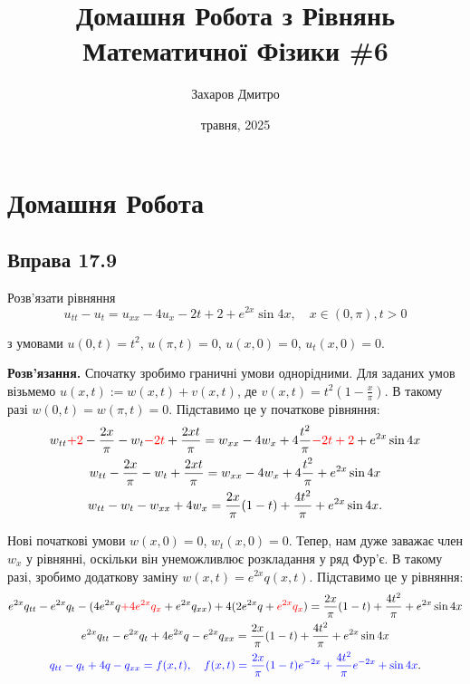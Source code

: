 \documentclass{hw_template}
\title{\huge\sffamily\bfseries Домашня Робота з Рівнянь Математичної Фізики \#6}
\author{\Large\sffamily Захаров Дмитро}
\date{\sffamily 27 травня, 2025}
\begin{document}
\pagestyle{fancy}

\maketitle

\tableofcontents

\pagebreak

\section{Домашня Робота}

\subsection{Вправа 17.9}

\begin{problem}
    Розв'язати рівняння
    \begin{equation*}
        u_{tt} - u_t = u_{xx} - 4u_x - 2t + 2 + e^{2x}\sin 4x, \quad x \in (0,\pi), t > 0
    \end{equation*}

    з умовами $u(0,t) = t^2$, $u(\pi, t) = 0$, $u(x,0) = 0$, $u_t(x,0) = 0$.
\end{problem}

\textbf{Розв'язання.} Спочатку зробимо граничні умови однорідними. Для заданих
умов візьмемо $u(x,t) := w(x,t) + v(x,t)$, де $v(x,t) =
t^2\left(1-\frac{x}{\pi}\right)$. В такому разі $w(0,t) = w(\pi, t) = 0$. 
Підставимо це у початкове рівняння:
\begin{gather*}
    w_{tt} \textcolor{red}{+ 2} - \frac{2x}{\pi} - w_t \textcolor{red}{- 2t} + \frac{2xt}{\pi} = w_{xx} - 4w_x + 4\frac{t^2}{\pi} \textcolor{red}{- 2t + 2} + e^{2x}\sin 4x \\
    w_{tt}  - \frac{2x}{\pi} - w_t + \frac{2xt}{\pi} = w_{xx} - 4w_x + 4\frac{t^2}{\pi} + e^{2x}\sin 4x \\
    w_{tt} - w_t - w_{xx} + 4w_x = \frac{2x}{\pi}(1-t) + \frac{4t^2}{\pi} + e^{2x} \sin 4x.
\end{gather*}

Нові початкові умови $w(x,0) = 0$, $w_t(x,0) = 0$. Тепер, нам дуже заважає член
$w_x$ у рівнянні, оскільки він унеможливлює розкладання у ряд Фур'є. В такому
разі, зробимо додаткову заміну $w(x,t) = e^{2x}q(x,t)$. Підставимо це у рівняння:
\begin{gather*}
    e^{2x}q_{tt} - e^{2x}q_t - (4e^{2x}q \textcolor{red}{+ 4e^{2x}q_x} + e^{2x}q_{xx}) + 4(2e^{2x}q + \textcolor{red}{e^{2x}q_x}) = \frac{2x}{\pi}(1-t) + \frac{4t^2}{\pi} + e^{2x} \sin 4x \\
    e^{2x}q_{tt} - e^{2x}q_t + 4e^{2x}q - e^{2x}q_{xx} = \frac{2x}{\pi}(1-t) + \frac{4t^2}{\pi} + e^{2x} \sin 4x \\
    \textcolor{blue}{q_{tt} - q_t + 4q - q_{xx} = f(x,t), \quad f(x,t) = \frac{2x}{\pi}(1-t)e^{-2x} + \frac{4t^2}{\pi}e^{-2x} + \sin 4x}.
\end{gather*}
\end{document}
